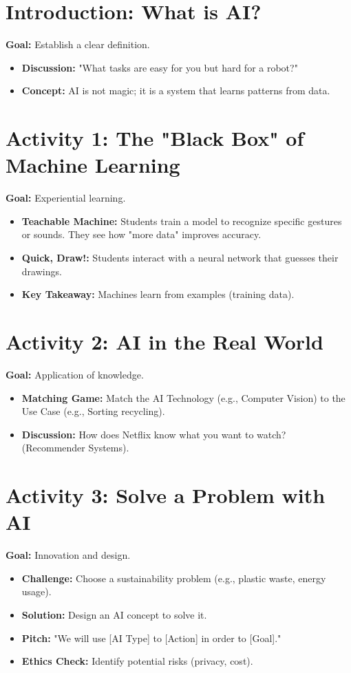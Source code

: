 \documentclass[11pt, a4paper]{article}
\begin{document}
\section{Introduction: What is AI?}
\textbf{Goal:} Establish a clear definition.
\begin{itemize}
    \item \textbf{Discussion:} "What tasks are easy for you but hard for a robot?"
    \item \textbf{Concept:} AI is not magic; it is a system that learns patterns from data.
\end{itemize}

\section{Activity 1: The "Black Box" of Machine Learning}
\textbf{Goal:} Experiential learning.
\begin{itemize}
    \item \textbf{Teachable Machine:} Students train a model to recognize specific gestures or sounds. They see how "more data" improves accuracy.
    \item \textbf{Quick, Draw!:} Students interact with a neural network that guesses their drawings.
    \item \textbf{Key Takeaway:} Machines learn from examples (training data).
\end{itemize}

\section{Activity 2: AI in the Real World}
\textbf{Goal:} Application of knowledge.
\begin{itemize}
    \item \textbf{Matching Game:} Match the AI Technology (e.g., Computer Vision) to the Use Case (e.g., Sorting recycling).
    \item \textbf{Discussion:} How does Netflix know what you want to watch? (Recommender Systems).
\end{itemize}

\section{Activity 3: Solve a Problem with AI}
\textbf{Goal:} Innovation and design.
\begin{itemize}
    \item \textbf{Challenge:} Choose a sustainability problem (e.g., plastic waste, energy usage).
    \item \textbf{Solution:} Design an AI concept to solve it.
    \item \textbf{Pitch:} "We will use [AI Type] to [Action] in order to [Goal]."
    \item \textbf{Ethics Check:} Identify potential risks (privacy, cost).
\end{itemize}
\end{document}
